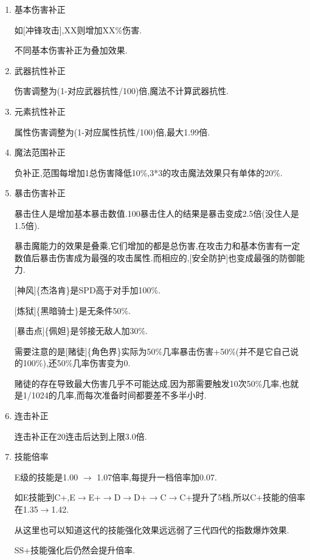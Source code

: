 \begin{enumerate}

	\item 基本伤害补正

	如[冲锋攻击],XX则增加XX\%伤害.

	不同基本伤害补正为叠加效果.

	\item 武器抗性补正

	伤害调整为(1-对应武器抗性/100)倍,魔法不计算武器抗性.

	\item 元素抗性补正
	
	属性伤害调整为(1-对应属性抗性/100)倍,最大1.99倍.

	\item 魔法范围补正
	
	负补正,范围每增加1总伤害降低10\%,3*3的攻击魔法效果只有单体的20\%.

	\item 暴击伤害补正

	暴击住人是增加基本暴击数值.100暴击住人的结果是暴击变成2.5倍(没住人是1.5倍).

	暴击魔能力的效果是叠乘,它们增加的都是总伤害,在攻击力和基本伤害有一定数值后暴击伤害成为最强的攻击属性.而相应的,[安全防护]也变成最强的防御能力.

	[神风]\{杰洛肯\}是SPD高于对手加100\%.

	[炼狱]\{黑暗骑士\}是无条件50\%.

	[暴击点]\{佩妲\}是邻接无敌人加30\%.

	需要注意的是[赌徒]\{角色界\}实际为50\%几率暴击伤害+50\%(并不是它自己说的100\%),还50\%几率伤害变为0.

	赌徒的存在导致最大伤害几乎不可能达成,因为那需要触发10次50\%几率,也就是1/1024的几率,而每次准备时间都要差不多半小时.

	\item 连击补正
	
	连击补正在20连击后达到上限3.0倍.

	\item 技能倍率

	E级的技能是1.00 $\rightarrow$ 1.07倍率,每提升一档倍率加0.07.

	如E技能到C+,E$\rightarrow$E+$\rightarrow$D$\rightarrow$D+$\rightarrow$C$\rightarrow$C+提升了5档,所以C+技能的倍率在1.35$\rightarrow$1.42.

	从这里也可以知道这代的技能强化效果远远弱了三代四代的指数爆炸效果.

	SS+技能强化后仍然会提升倍率.

\end{enumerate}

